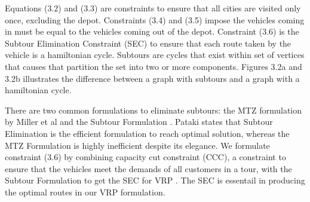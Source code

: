 Equations (3.2) and (3.3) are constraints to ensure that all cities are visited only once, excluding the depot. Constraints (3.4) and (3.5)
impose the vehicles coming in must be equal to the vehicles coming out of the depot. Constraint (3.6) is the Subtour
Elimination Constraint (SEC) to ensure that each route taken by the vehicle is a hamiltonian cycle. Subtours are cycles that exist within set of vertices that causes
that partition the set into two or more components. Figures 3.2a and 3.2b illustrates the difference between a graph with subtours and a graph with a hamiltonian cycle.

There are two common formulations to eliminate subtours: the MTZ formulation by Miller et al \cite{Miller1960} and
the Subtour Formulation \cite{Lawler1985, Pataki2003}. Pataki \cite{Pataki2000} states that Subtour Elimination is the efficient formulation to reach optimal solution, whereas
the MTZ Formulation is highly inefficient despite its elegance. We formulate constraint (3.6) by combining capacity cut constraint (CCC), a constraint to ensure
that the vehicles meet the demands of all customers in a tour, with the Subtour Formulation to get the SEC for VRP \cite{Daneshzand2011}.
The SEC is essentail in producing the optimal routes in our VRP formulation.

